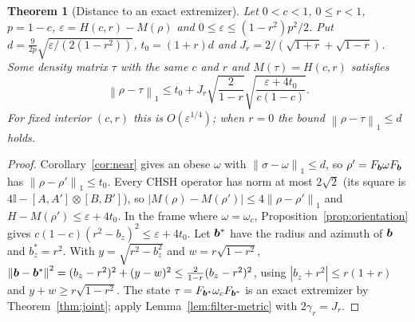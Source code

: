 \documentclass[11pt]{article}
\newtheorem{theorem}{Theorem}[section]
\theoremstyle{remark}\newtheorem{remark}[theorem]{Remark}
\newcommand{\id}{\mathbb I}\newcommand{\ket}[1]{|#1\rangle}
\newcommand{\norm}[1]{\left\lVert#1\right\rVert}
\newcommand{\eps}{\varepsilon}
\begin{document}
\begin{theorem}[Distance to an exact extremizer]\label{thm:physical-rigidity}
Let $0<c<1$, $0\le r<1$, $p=1-c$, $\eps=H(c,r)-M(\rho)$ and
$0\le\eps\le(1-r^2)p^2/2$. Put $d=\frac9{2p}\sqrt{\eps/(2(1-r^2))}$,
$t_0=(1+r)d$ and $J_r=2/(\sqrt{1+r}+\sqrt{1-r})$. Some density matrix $\tau$
with the same $c$ and $r$ and $M(\tau)=H(c,r)$ satisfies
\begin{equation}\label{eq:physical-rigidity}
 \norm{\rho-\tau}_1\le t_0+J_r\sqrt{\frac2{1-r}}\sqrt{\frac{\eps+4t_0}{c(1-c)}}.
\end{equation}
For fixed interior $(c,r)$ this is $O(\eps^{1/4})$; when $r=0$ the bound
$\norm{\rho-\tau}_1\le d$ holds.
\end{theorem}
\begin{proof}
Corollary~\ref{cor:near} gives an obese $\omega$ with
$\norm{\sigma-\omega}_1\le d$, so $\rho'=F_{\bm b}\omega F_{\bm b}$ has
$\norm{\rho-\rho'}_1\le t_0$. Every CHSH operator has norm at most
$2\sqrt2$ (its square is $4\id-[A,A']\otimes[B,B']$), so
$|M(\rho)-M(\rho')|\le4\norm{\rho-\rho'}_1$ and $H-M(\rho')\le\eps+4t_0$. In the
frame where $\omega=\omega_c$, Proposition~\ref{prop:orientation} gives
$c(1-c)(r^2-b_z)^2\le\eps+4t_0$. Let $\bm b^*$ have the radius and azimuth of
$\bm b$ and $b^*_z=r^2$. With $y=\sqrt{r^2-b_z^2}$ and $w=r\sqrt{1-r^2}$,
$\norm{\bv-\bv^*}^2=(b_z-r^2)^2+(y-w)^2\le\frac2{1-r}(b_z-r^2)^2$, using
$|b_z+r^2|\le r(1+r)$ and $y+w\ge r\sqrt{1-r^2}$. The state
$\tau=F_{\bm b^*}\omega_cF_{\bm b^*}$ is an exact extremizer by
Theorem~\ref{thm:joint}; apply Lemma~\ref{lem:filter-metric} with
$2\gamma_r=J_r$.
\end{proof}
\end{document}
